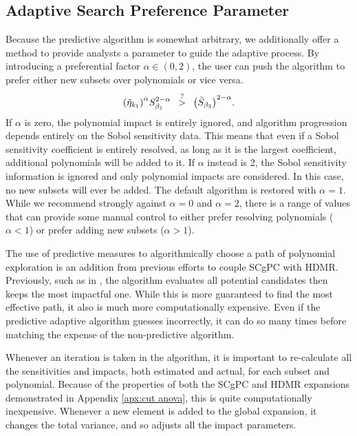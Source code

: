 \subsection{Adaptive Search Preference Parameter}
Because the predictive algorithm is somewhat arbitrary, we additionally offer a method to provide analysts a
parameter to guide the adaptive process.  By introducing a preferential factor $\alpha\in(0,2)$, the user can
push the algorithm to prefer either new subsets over polynomials or vice versa.
\begin{equation}
  \qty(\tilde\eta_{k_1})^\alpha S_{\beta_1}^{2-\alpha} \hspace{5pt}\stackrel{?}>\hspace{5pt} 
         \qty(\tilde S_{\beta_3})^{2-\alpha}.
\end{equation}
If $\alpha$ is zero, the polynomial impact is entirely ignored, and algorithm progression depends entirely on
the Sobol sensitivity data.  This means that even if a Sobol sensitivity coefficient is entirely resolved, as
long as it is the largest coefficient, additional polynomials will be added to it.  If $\alpha$ instead is 2,
the Sobol sensitivity information is ignored and only polynomial impacts are considered.  In this case, no new
subsets will ever be added.  The default algorithm is restored with $\alpha=1$.  While we recommend strongly
against $\alpha=0$ and $\alpha=2$, there is a range of values that can provide some manual control to either
prefer resolving polynomials ($\alpha<1$) or prefer adding new subsets ($\alpha > 1$).

The use of predictive measures to algorithmically choose a path of polynomial exploration is an addition from 
previous efforts to couple
SCgPC with HDMR.  Previously, such as in \cite{Gerstner}, the
algorithm evaluates all potential candidates then keeps the most impactful one.  While this is more guaranteed
to find the most effective path, it also is much more computationally expensive.  Even if the predictive adaptive
algorithm guesses incorrectly, it can do so many times before matching the expense of the non-predictive
algorithm.

Whenever an iteration is taken in the algorithm, it is important to re-calculate all the sensitivities and
impacts, both estimated and actual, for each subset and polynomial.  Because of the properties of both the
SCgPC and HDMR expansions demonstrated in Appendix \ref{apx:cut anova}, this is quite
computationally inexpensive.  Whenever a new element is added to the global expansion, it changes the total
variance, and so adjusts all the impact parameters.

